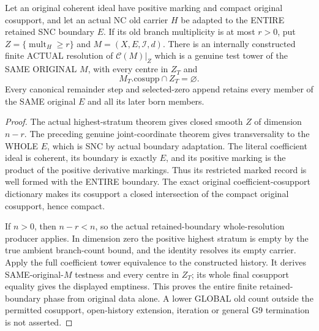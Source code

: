 \begin{theorem}
\label{hir:original-boundary-nc-whole-coefficient-stratum-resolution}
\leanok
Let an original coherent ideal have positive marking and compact original
cosupport, and let an actual NC old carrier $H$ be adapted to the ENTIRE
retained SNC boundary $E$. If its old branch multiplicity is at most $r>0$,
put $Z=\{\operatorname{mult}_H\ge r\}$ and $M=(X,E,\mathcal I,d)$.
There is an internally constructed finite ACTUAL resolution of
$\mathcal C(M)|_Z$ which is a genuine test tower of the SAME ORIGINAL
$M$, with every centre in $Z_T$ and
\[
 M_T.\mathrm{cosupp}\cap Z_T=\varnothing.
\]
Every canonical remainder step and selected-zero append retains every
member of the SAME original $E$ and all its later born members.
\end{theorem}
\begin{proof}
The actual highest-stratum theorem gives closed smooth $Z$ of dimension
$n-r$. The preceding genuine joint-coordinate theorem gives transversality
to the WHOLE $E$, which is SNC by actual boundary adaptation. The literal
coefficient ideal is coherent, its boundary is exactly $E$, and its positive
marking is the product of the positive derivative markings. Thus its
restricted marked record is well formed with the ENTIRE boundary. The exact
original coefficient-cosupport dictionary makes its cosupport a closed
intersection of the compact original cosupport, hence compact.

If $n>0$, then $n-r<n$, so the actual retained-boundary whole-resolution
producer applies. In dimension zero the positive highest stratum is empty
by the true ambient branch-count bound, and the identity resolves its empty
carrier. Apply the full coefficient tower equivalence to the constructed
history. It derives SAME-original-$M$ testness and every centre in $Z_T$;
its whole final cosupport equality gives the displayed emptiness. This proves
the entire finite retained-boundary phase from original data alone. A lower
GLOBAL old count outside the permitted cosupport, open-history extension,
iteration or general G9 termination is not asserted.
\end{proof}

